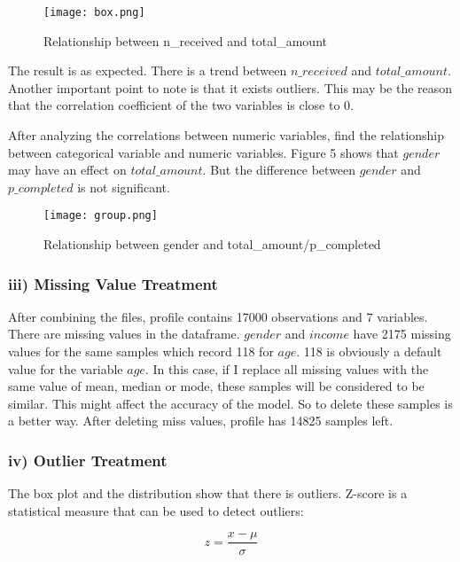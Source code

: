 \documentclass[a4paper,12pt]{article}
\begin{document}
\begin{figure}[H]
    \centering
    \texttt{[image: box.png]} 
    \caption{Relationship between n\_received and total\_amount}
\end{figure}

The result is as expected. There is a trend between $n\_received$ and $total\_amount$. Another important point to note is that 
it exists outliers. This may be the reason that the correlation coefficient of the two variables is close to 0.

After analyzing the correlations between numeric variables, find the relationship between categorical variable and numeric 
variables. Figure 5 shows that $gender$ may have an effect on $total\_amount$. But the difference between $gender$ and 
$p\_completed$ is not significant.

\begin{figure}[H]
    \centering
    \texttt{[image: group.png]} 
    \caption{Relationship between gender and total\_amount/p\_completed}
\end{figure}

\subsubsection*{iii) Missing Value Treatment}

After combining the files, profile contains 17000 observations and 7 variables. There are missing values in the dataframe. 
$gender$ and $income$ have 2175 missing values for the same samples which record 118 for $age$. 118 is obviously a default value 
for the variable $age$. In this case, if I replace all missing values with the same value of mean, median or mode, these samples 
will be considered to be similar. This might affect the accuracy of the model. So to delete these samples is a better way. After 
deleting miss values, profile has 14825 samples left.

\subsubsection*{iv) Outlier Treatment}

The box plot and the distribution show that there is outliers. Z-score is a statistical measure that can be used to detect 
outliers:

\begin{equation}
    z = \frac{x - \mu}{\sigma}
\end{equation}
\end{document}
